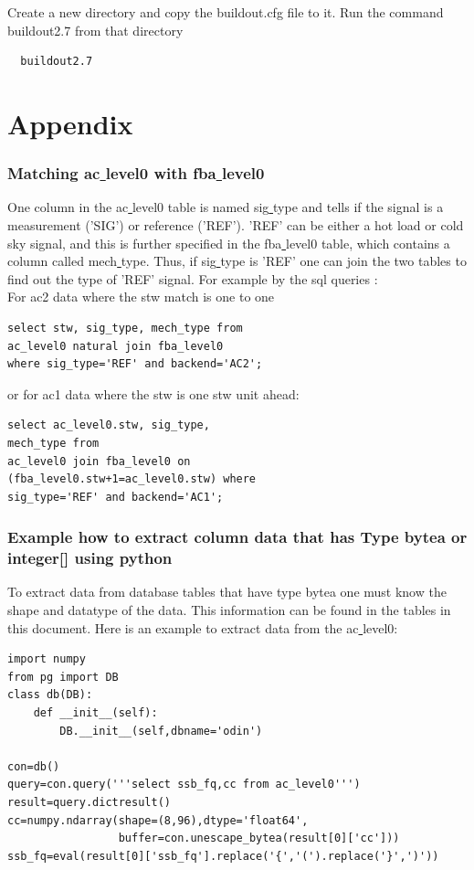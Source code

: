 \documentclass[12pt]{article}
\begin{document}
Create a new directory and copy the  buildout.cfg file to it. Run the command buildout2.7 from that directory
\begin{verbatim}
  buildout2.7
\end{verbatim}

\section{Appendix}
\subsubsection*{Matching ac\underline{ }level0 with fba\underline{ }level0}
 One column in the ac\underline{ }level0
table is named sig\underline{ }type and tells if the signal is 
a measurement ('SIG') or reference ('REF').
'REF' can be either a hot load or cold sky signal, and this is
further specified in the fba\underline{ }level0 table,
which contains a column called mech\underline{ }type.
Thus, if sig\underline{ }type is 'REF' one can join the two
tables to find out the type of 'REF' signal.
For example by the sql queries :\\
For ac2 data where the stw match is one to one\\
\begin{verbatim}
select stw, sig_type, mech_type from 
ac_level0 natural join fba_level0 
where sig_type='REF' and backend='AC2';
\end{verbatim}
or for ac1 data where the stw is one stw unit ahead:
\begin{verbatim}
select ac_level0.stw, sig_type,
mech_type from 
ac_level0 join fba_level0 on 
(fba_level0.stw+1=ac_level0.stw) where 
sig_type='REF' and backend='AC1';
\end{verbatim}

\subsubsection*{Example how to extract column data that has Type bytea
or integer[] using python}
To extract data from database tables that have type bytea one must
know the shape and datatype of the data. This information
can be found in the tables in this document. Here is an example
to extract data from the ac\underline{ }level0: 

\begin{verbatim}
import numpy
from pg import DB
class db(DB):
    def __init__(self):
        DB.__init__(self,dbname='odin')

con=db()
query=con.query('''select ssb_fq,cc from ac_level0''')
result=query.dictresult()
cc=numpy.ndarray(shape=(8,96),dtype='float64',
                 buffer=con.unescape_bytea(result[0]['cc']))
ssb_fq=eval(result[0]['ssb_fq'].replace('{','(').replace('}',')'))
\end{verbatim}
\clearpage
\newpage
\end{document}
